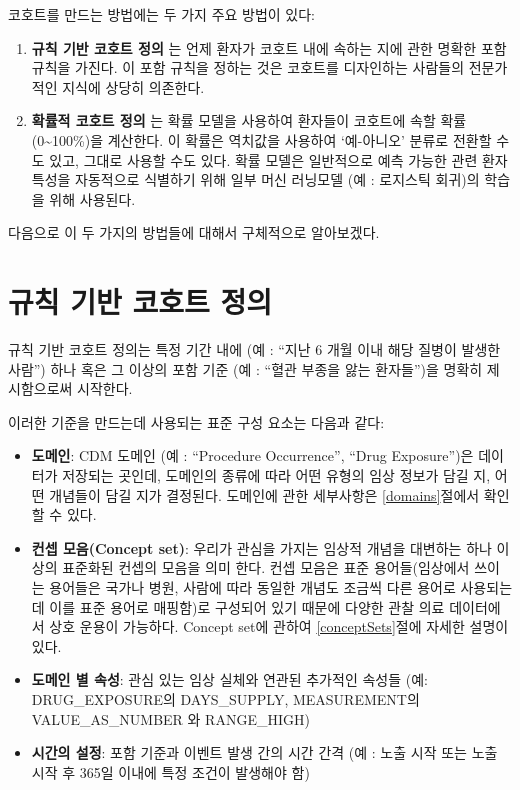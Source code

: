 \documentclass[11pt]{book}
\providecommand{\tightlist}{%
  \setlength{\itemsep}{0pt}\setlength{\parskip}{0pt}}
\theoremstyle{definition}
\theoremstyle{definition}
\theoremstyle{definition}
\theoremstyle{remark}
\begin{document}
코호트를 만드는 방법에는 두 가지 주요 방법이 있다:

\begin{enumerate}
\def\labelenumi{\arabic{enumi}.}
\tightlist
\item
  \textbf{규칙 기반 코호트 정의} 는 언제 환자가 코호트 내에 속하는 지에
  관한 명확한 포함규칙을 가진다. 이 포함 규칙을 정하는 것은 코호트를
  디자인하는 사람들의 전문가적인 지식에 상당히 의존한다.
\item
  \textbf{확률적 코호트 정의} 는 확률 모델을 사용하여 환자들이 코호트에
  속할 확률 (0\textasciitilde{}100\%)을 계산한다. 이 확률은 역치값을
  사용하여 `예-아니오' 분류로 전환할 수도 있고, 그대로 사용할 수도 있다.
  확률 모델은 일반적으로 예측 가능한 관련 환자 특성을 자동적으로
  식별하기 위해 일부 머신 러닝모델 (예 : 로지스틱 회귀)의 학습을 위해
  사용된다.
\end{enumerate}

다음으로 이 두 가지의 방법들에 대해서 구체적으로 알아보겠다.

\section{규칙 기반 코호트 정의}\label{---}

규칙 기반 코호트 정의는 특정 기간 내에 (예 : ``지난 6 개월 이내 해당
질병이 발생한 사람'') 하나 혹은 그 이상의 포함 기준 (예 : ``혈관 부종을
앓는 환자들'')을 명확히 제시함으로써 시작한다.

이러한 기준을 만드는데 사용되는 표준 구성 요소는 다음과 같다:

\begin{itemize}
\item
  \textbf{도메인}: CDM 도메인 (예 : ``Procedure Occurrence'', ``Drug
  Exposure'')은 데이터가 저장되는 곳인데, 도메인의 종류에 따라 어떤
  유형의 임상 정보가 담길 지, 어떤 개념들이 담길 지가 결정된다. 도메인에
  관한 세부사항은 \ref{domains}절에서 확인할 수 있다.
\item
  \textbf{컨셉 모음(Concept set)}: 우리가 관심을 가지는 임상적 개념을
  대변하는 하나 이상의 표준화된 컨셉의 모음을 의미 한다. 컨셉 모음은
  표준 용어들(임상에서 쓰이는 용어들은 국가나 병원, 사람에 따라 동일한
  개념도 조금씩 다른 용어로 사용되는데 이를 표준 용어로 매핑함)로
  구성되어 있기 때문에 다양한 관찰 의료 데이터에서 상호 운용이 가능하다.
  Concept set에 관하여 \ref{conceptSets}절에 자세한 설명이 있다.
\item
  \textbf{도메인 별 속성}: 관심 있는 임상 실체와 연관된 추가적인 속성들
  (예: DRUG\_EXPOSURE의 DAYS\_SUPPLY, MEASUREMENT의 VALUE\_AS\_NUMBER 와
  RANGE\_HIGH)
\item
  \textbf{시간의 설정}: 포함 기준과 이벤트 발생 간의 시간 간격 (예 :
  노출 시작 또는 노출 시작 후 365일 이내에 특정 조건이 발생해야 함)
\end{itemize}
\end{document}

